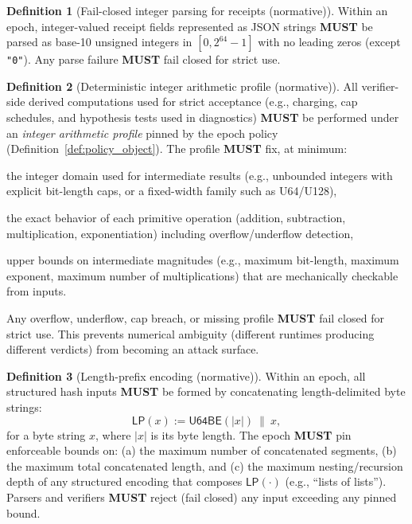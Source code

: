 \documentclass[11pt]{article}
\newcommand{\MUST}{\textbf{MUST}}
\newcommand{\code}[1]{\texttt{#1}}
\newcommand{\term}[1]{\emph{#1}}
\newcommand{\1}{\mathbf{1}}
\newcommand{\LP}{\mathsf{LP}}
\theoremstyle{definition}
\newtheorem{definition}{Definition}
\theoremstyle{plain}
\begin{document}
\begin{definition}[Fail-closed integer parsing for receipts (normative)]
\label{def:parse_u64}
Within an epoch, integer-valued receipt fields represented as JSON strings \MUST{} be parsed as base-10 unsigned integers in $[0,2^{64}-1]$ with no leading zeros (except \code{"0"}). Any parse failure \MUST{} fail closed for strict use.
\end{definition}

\begin{definition}[Deterministic integer arithmetic profile (normative)]
\label{def:arith_profile}
All verifier-side derived computations used for strict acceptance (e.g., charging, cap schedules, and hypothesis tests used in diagnostics) \MUST{} be performed under an \term{integer arithmetic profile} pinned by the epoch policy (Definition~\ref{def:policy_object}). The profile \MUST{} fix, at minimum:
\begin{tightitemize}
\item the integer domain used for intermediate results (e.g., unbounded integers with explicit bit-length caps, or a fixed-width family such as \textsf{U64}/\textsf{U128}),
\item the exact behavior of each primitive operation (addition, subtraction, multiplication, exponentiation) including overflow/underflow detection,
\item upper bounds on intermediate magnitudes (e.g., maximum bit-length, maximum exponent, maximum number of multiplications) that are mechanically checkable from inputs.
\end{tightitemize}
Any overflow, underflow, cap breach, or missing profile \MUST{} fail closed for strict use. This prevents numerical ambiguity (different runtimes producing different verdicts) from becoming an attack surface.
\end{definition}

\begin{definition}[Length-prefix encoding (normative)]
\label{def:lp}
Within an epoch, all structured hash inputs \MUST{} be formed by concatenating length-delimited byte strings:
\[
\LP(x) := \mathsf{U64BE}(|x|)\ \|\ x,
\]
for a byte string $x$, where $|x|$ is its byte length.
The epoch \MUST{} pin enforceable bounds on:
(a) the maximum number of concatenated segments,
(b) the maximum total concatenated length, and
(c) the maximum nesting/recursion depth of any structured encoding that composes $\LP(\cdot)$ (e.g., ``lists of lists'').
Parsers and verifiers \MUST{} reject (fail closed) any input exceeding any pinned bound.
\end{definition}
\end{document}
